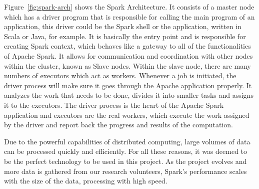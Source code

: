 Figure~\ref{fig:spark-arch} shows the Spark Architecture. It consists of a master node which has a driver program that is responsible for calling the main program of an application, this driver could be the Spark shell or the application, written in Scala or Java, for example. It is basically the entry point and is responsible for creating Spark context, which behaves like a gateway to all of the functionalities of Apache Spark. It allows for communication and coordination with other nodes within the cluster, known as Slave nodes. Within the slave node, there are many numbers of executors which act as workers. Whenever a job is initiated, the driver process will make sure it goes through the Apache application properly. It analyzes the work that needs to be done, divides it into smaller tasks and assigns it to the executors. The driver process is the heart of the Apache Spark application and executors are the real workers, which execute the work assigned by the driver and report back the progress and results of the computation.\cite{8988541}

Due to the powerful capabilities of distributed computing, large volumes of data can be processed quickly and efficiently. For all these reasons, it was deemed to be the perfect technology to be used in this project. As the project evolves and more data is gathered from our research volunteers, Spark's performance scales with the size of the data, processing with high speed.


